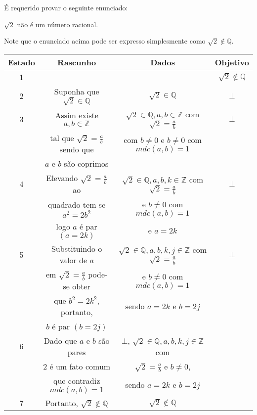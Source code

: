 \begin{exem}\label{exe:ProvaAbsurdo2}
	É requerido provar o seguinte enunciado:
	\begin{center}
		$\sqrt{2}$ não é um número racional.
	\end{center}
	Note que o enunciado acima pode ser expresso simplesmente como $\sqrt{2} \notin \mathbb{Q}$.
	
	\begin{table*}[h]
		\centering
		\begin{tabular}{c|c|c|c}
			\hline
			\rowcolor{cinzaClaro}
			Estado & Rascunho & Dados & Objetivo\\
			\hline
			1 & & & $\sqrt{2} \notin \mathbb{Q}$\\
			2 & Suponha que $\sqrt{2} \in \mathbb{Q}$ & $\sqrt{2} \in \mathbb{Q}$ & $\bot$\\	
			3 & Assim existe $a, b \in \mathbb{Z}$ & $\sqrt{2} \in \mathbb{Q}, a, b \in \mathbb{Z}$ com $\sqrt{2} = \frac{a}{b}$& $\bot$\\
			& tal que $\sqrt{2} = \frac{a}{b}$ sendo que & com $b \neq 0$ e $b \neq 0$ com $mdc(a,b) = 1$ & \\
			& $a$ e $b$ são coprimos& &\\ 
			4 & Elevando $\sqrt{2} = \frac{a}{b}$ ao & $\sqrt{2} \in \mathbb{Q}, a, b, k \in \mathbb{Z}$ com $\sqrt{2} = \frac{a}{b}$ & $\bot$\\
			& quadrado tem-se $a^2 = 2b^2$ & e $b \neq 0$ com $mdc(a,b) = 1$ &\\
			& logo $a$ é par $(a = 2k)$ & e $a = 2k$ &\\
			5 & Substituindo o valor de $a$ & $\sqrt{2} \in \mathbb{Q}, a, b, k, j \in \mathbb{Z}$ com $\sqrt{2} = \frac{a}{b}$ & $\bot$\\
			& em $\sqrt{2} = \frac{a}{b}$ pode-se obter & e $b \neq 0$ com $mdc(a,b) = 1$ &\\
			& que $b^2 = 2k^2$, portanto, & sendo $a = 2k$ e $b = 2j$ &\\
			& $b$ é par $(b = 2j)$ & & \\
			6 & Dado que $a$ e $b$ são pares &  $\bot$,  $\sqrt{2} \in \mathbb{Q}, a, b, k, j \in \mathbb{Z}$ com & \\
			& 2 é um fato comum & $\sqrt{2} = \frac{a}{b}$ e $b \neq 0$, &\\
			& que contradiz $mdc(a,b) = 1$ & sendo $a = 2k$ e $b = 2j$ & \\	
			7 & Portanto, $\sqrt{2} \notin \mathbb{Q}$ & $\sqrt{2} \notin \mathbb{Q}$ &\\
			\hline
		\end{tabular}
	\end{table*}


\end{exem}
